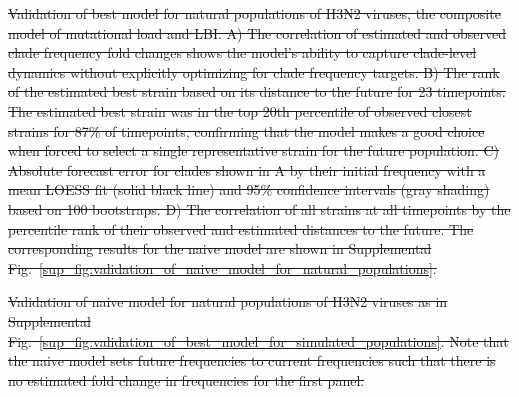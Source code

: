 \documentclass[9pt,lineno]{elife} %
\providecommand{\DIFdel}[1]{{\protect\color{red}\sout{#1}}}                      %
\providecommand{\DIFdelFL}[1]{\DIFdel{#1}} %
\providecommand{\DIFdeltex}[1]{{\protect\color{red}\sout{#1}}}                      %
\providecommand{\DIFdelFL}[1]{\DIFdel{#1}} %
\providecommand{\DIFdel}[1]{\texorpdfstring{\DIFdeltex{#1}}{}} %
\begin{document}
{%
\DIFdelFL{Validation of best model for natural populations of H3N2 viruses, the composite model of mutational load and LBI.
  A) The correlation of estimated and observed clade frequency fold changes shows the model's ability to capture clade-level dynamics without explicitly optimizing for clade frequency targets.
  B) The rank of the estimated best strain based on its distance to the future for 23 timepoints.
  The estimated best strain was in the top 20th percentile of observed closest strains for 87\% of timepoints, confirming that the model makes a good choice when forced to select a single representative strain for the future population.
  C) Absolute forecast error for clades shown in A by their initial frequency with a mean LOESS fit (solid black line) and 95\% confidence intervals (gray shading) based on 100 bootstraps.
  D) The correlation of all strains at all timepoints by the percentile rank of their observed and estimated distances to the future.
  The corresponding results for the naive model are shown in Supplemental Fig.~\ref{sup_fig:validation_of_naive_model_for_natural_populations}.
  }}

{%
\DIFdelFL{Validation of naive model for natural populations of H3N2 viruses as in Supplemental Fig.~\ref{sup_fig:validation_of_best_model_for_simulated_populations}.
  Note that the naive model sets future frequencies to current frequencies such that there is no estimated fold change in frequencies for the first panel.
  }}
\end{document}
